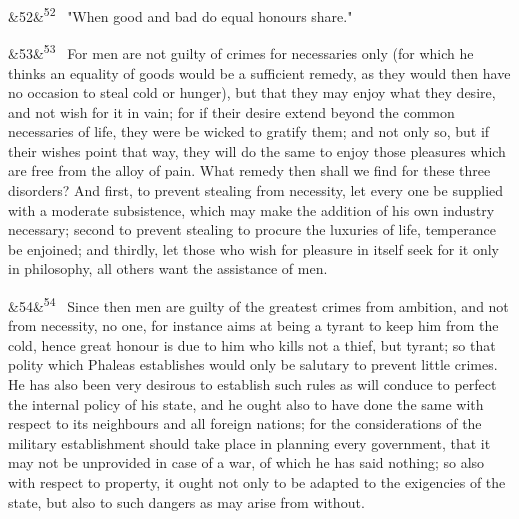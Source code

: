 \documentclass[12pt]{article}
\newcommand{\para}[1][]{\par\noindent\ifx&#1&\else\textsuperscript{\footnotesize #1}~\fi}
\begin{document}
\para[52] "When good and bad do equal honours share."

\para[53] For men are not guilty of crimes for necessaries only (for which he thinks an equality of goods would be a sufficient remedy, as they would then have no occasion to steal cold or hunger), but that they may enjoy what they desire, and not wish for it in vain; for if their desire extend beyond the common necessaries of life, they were be wicked to gratify them; and not only so, but if their wishes point that way, they will do the same to enjoy those pleasures which are free from the alloy of pain. What remedy then shall we find for these three disorders? And first, to prevent stealing from necessity, let every one be supplied with a moderate subsistence, which may make the addition of his own industry necessary; second to prevent stealing to procure the luxuries of life, temperance be enjoined; and thirdly, let those who wish for pleasure in itself seek for it only in philosophy, all others want the assistance of men.

\para[54] Since then men are guilty of the greatest crimes from ambition, and not from necessity, no one, for instance aims at being a tyrant to keep him from the cold, hence great honour is due to him who kills not a thief, but tyrant; so that polity which Phaleas establishes would only be salutary to prevent little crimes. He has also been very desirous to establish such rules as will conduce to perfect the internal policy of his state, and he ought also to have done the same with respect to its neighbours and all foreign nations; for the considerations of the military establishment should take place in planning every government, that it may not be unprovided in case of a war, of which he has said nothing; so also with respect to property, it ought not only to be adapted to the exigencies of the state, but also to such dangers as may arise from without.
\end{document}
